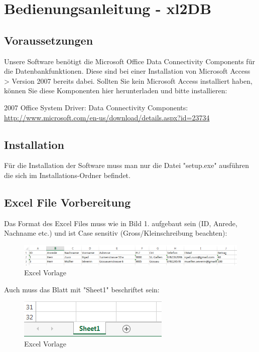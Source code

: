 \documentclass{article}
\begin{document}
\section*{\centering Bedienungsanleitung  - xl2DB}
\subsection*{Voraussetzungen}
Unsere Software benötigt die Microsoft Office Data Connectivity Components für die Datenbankfunktionen. Diese sind bei einer Installation von Microsoft Access > Version 2007 bereits dabei. Sollten Sie kein Microsoft Access installiert haben, können Sie diese Komponenten hier herunterladen und bitte installieren:

2007 Office System Driver: Data Connectivity Components:\\
\url{http://www.microsoft.com/en-us/download/details.aspx?id=23734}

\subsection*{Installation}
Für die Installation der Software muss man nur die Datei "setup.exe" ausführen die sich im Installations-Ordner befindet.

\subsection*{Excel File Vorbereitung}
Das Format des Excel Files muss wie in Bild 1. aufgebaut sein (ID, Anrede, Nachname etc.) und ist Case sensitiv (Gross/Kleinschreibung beachten): 
\begin{figure}[h]
	\begin{center}
		\centering
		\includegraphics[width=0.8\paperwidth]{vorlageExcel}
		\caption{Excel Vorlage}
	\end{center}
\end{figure}

Auch muss das Blatt mit "Sheet1" beschriftet sein: 
\begin{figure}[h]
	\begin{center}
		\centering
		\includegraphics[width=0.3\paperwidth]{vorlageExcelSheet1}
		\caption{Excel Vorlage}
	\end{center}
\end{figure}
\end{document}

